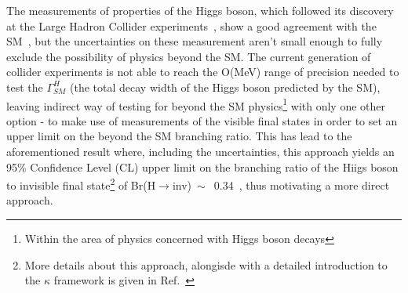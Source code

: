 \hspace{10pt} The measurements of properties of the Higgs boson, which followed its discovery at the Large Hadron Collider experiments~\cite{paper:higgs_discovery1,paper:higgs_discovery2}, show a good agreement with the SM~\cite{paper:higgs_prop1,paper:higgs_prop2,paper:higgs_prop3}, but the uncertainties on these measurement aren't small enough to fully exclude the possibility of physics beyond the SM. The current generation of collider experiments is not able to reach the O(MeV) range of precision needed to test the $\Gamma_{SM}^H$ (the total decay width of the Higgs boson predicted by the SM), leaving indirect way of testing for beyond the SM physics\footnote{Within the area of physics concerned with Higgs boson decays} with only one other option - to make use of measurements of the visible final states in order to set an upper limit on the beyond the SM branching ratio. This has lead to the aforementioned result where, including the uncertainties, this approach yields an 95\% Confidence Level (CL) upper limit on the branching ratio of the Hiigs boson to invisible final state\footnote{More details about this approach, alongisde with a detailed introduction to the $\kappa$ framework is given in Ref.~\cite{report_lhcxswg_3}} of Br(H$\rightarrow$inv)$~\sim$~0.34~\cite{paper:higgs_prop1}, thus motivating a more direct approach.



